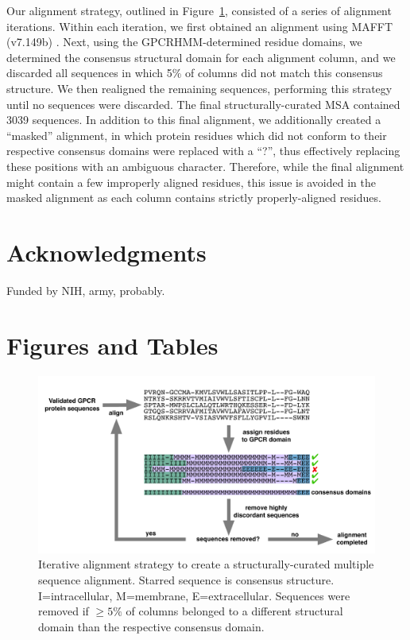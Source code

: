 \documentclass[fleqn,10pt]{wlpeerj}
\begin{document}
Our alignment strategy, outlined in Figure~\ref{flowchart}, consisted of a series of alignment iterations. Within each iteration, we first obtained an alignment using MAFFT (v7.149b) \cite{mafftv7}. Next, using the GPCRHMM-determined residue domains, we determined the consensus structural domain for each alignment column, and we discarded all sequences in which 5\% of columns did not match this consensus structure. We then realigned the remaining sequences, performing this strategy until no sequences were discarded. The final structurally-curated MSA contained 3039 sequences. In addition to this final alignment, we additionally created a ``masked'' alignment, in which protein residues which did not conform to their respective consensus domains were replaced with a ``?'', thus effectively replacing these positions with an ambiguous character. Therefore, while the final alignment might contain a few improperly aligned residues, this issue is avoided in the masked alignment as each column contains strictly properly-aligned residues.  




\section*{Acknowledgments}

Funded by NIH, army, probably.




\newpage


\section*{Figures and Tables}

\vspace{3cm}

\begin{figure}[htbp]
	\centerline{\includegraphics[width=18cm]{figures/alignment_flowchart.pdf}}
	\caption{\label{flowchart} Iterative alignment strategy to create a structurally-curated multiple sequence alignment. Starred sequence is consensus structure. I=intracellular, M=membrane, E=extracellular. Sequences were removed if $\geq 5\%$ of columns belonged to a different structural domain than the respective consensus domain.}
\end{figure}
\end{document}
